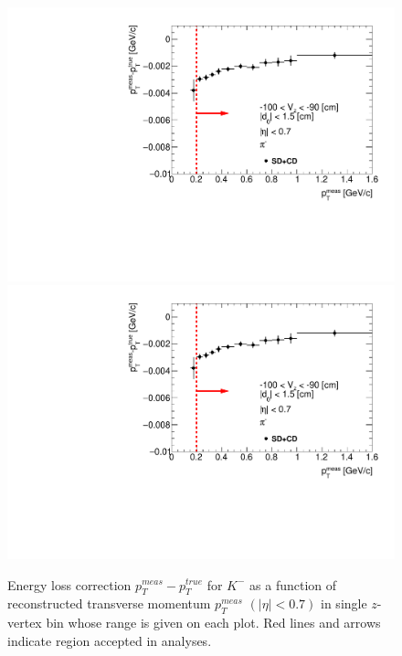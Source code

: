\begin{figure}[H]
	\caption[Energy loss correction for $K^-$ as a function of reconstructed transverse momentum $p_T^{meas}$.]{Energy loss correction $p_T^{meas}-p_T^{true}$ for $K^-$ as a function of reconstructed transverse momentum $p_T^{meas}$ $\left(|\eta|<0.7\right)$ in single $z$-vertex bin whose range is given on each plot. Red lines and arrows indicate region accepted in analyses.}\label{fig:energyLossPrimaryK_minus}
	\parbox{0.329\textwidth}{
		\includegraphics[width=\linewidth,page=23]{graphics/energyLoss/energyLoss3D_OnePrtAlso.pdf}\\
		\includegraphics[width=\linewidth,page=26]{graphics/energyLoss/energyLoss3D_OnePrtAlso.pdf}\\
}
\end{figure}
